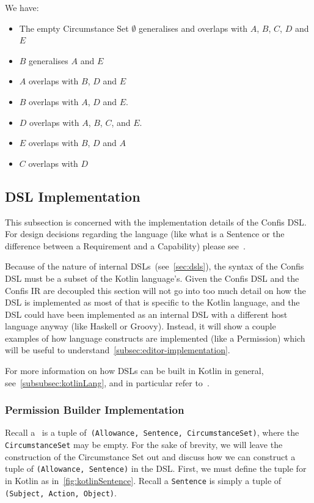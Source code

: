 We have:
\begin{itemize}
    \item The empty Circumstance Set $\emptyset$ generalises and overlaps with $A$, $B$, $C$, $D$ and $E$
    \item $B$ generalises $A$ and $E$
    \item $A$ overlaps with $B$, $D$ and $E$
    \item $B$ overlaps with $A$, $D$ and $E$.
    \item $D$ overlaps with $A$, $B$, $C$, and $E$.
    \item $E$ overlaps with $B$, $D$ and $A$
    \item $C$ overlaps with $D$
\end{itemize}

\subsection{DSL Implementation}\label{subsec:dsl-implementation}

This subsection is concerned with the implementation details of the Confis DSL.
For design decisions regarding the language (like what is a Sentence or the difference between a Requirement and a Capability) please see~.

Because of the nature of internal DSLs~(see~\autoref{sec:dsls}), the syntax of the Confis DSL must be a subset of the Kotlin language's.
Given the Confis DSL and the Confis IR are decoupled this section will not go into too much detail on how the DSL is implemented as most of that is specific to the Kotlin language, and the DSL could have been implemented as an internal DSL with a different host language anyway (like Haskell or Groovy).
Instead, it will show a couple examples of how language constructs are implemented (like a Permission) which will be useful to understand~\autoref{subsec:editor-implementation}.

For more information on how DSLs can be built in Kotlin in general, see~\autoref{subsubsec:kotlinLang}, and in particular refer to~\cite{kotlinTypeSafeBuilders}.

\subsubsection{Permission Builder Implementation}

Recall a~ is a tuple of~\texttt{(Allowance, Sentence, CircumstanceSet)}, where the \texttt{CircumstanceSet} may be empty.
For the sake of brevity, we will leave the construction of the Circumstance Set out and discuss how we can construct a tuple of \texttt{(Allowance, Sentence)} in the DSL.
First, we must define the tuple for~ in Kotlin as in~\autoref{fig:kotlinSentence}.
Recall a \texttt{Sentence} is simply a tuple of \texttt{(Subject, Action, Object)}.

